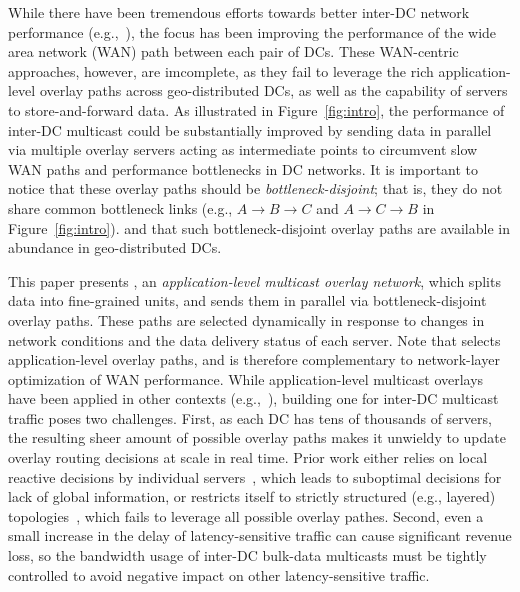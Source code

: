 While there have been tremendous efforts towards better inter-DC 
network performance (e.g.,~\cite{savage1999Theend,jain2013b4,
kumar2015bwe,hong2013achieving,zhang2015guarantee}), the focus has
been improving the performance of the wide area network (WAN) path 
between each pair of DCs. These WAN-centric approaches, however, are
imcomplete, as they fail to leverage the rich application-level 
overlay paths across geo-distributed DCs, as well as the capability 
of servers to store-and-forward data.
As illustrated in Figure~\ref{fig:intro}, the performance of inter-DC
multicast could be substantially improved by sending data in parallel
via multiple overlay servers acting as intermediate points to 
circumvent slow WAN paths and performance bottlenecks in DC networks.
It is important to notice that these overlay paths should be {\em 
bottleneck-disjoint}; that is, they do not share common bottleneck 
links (e.g., $A$$\rightarrow$$B$$\rightarrow$$C$ and  
$A$$\rightarrow$$C$$\rightarrow$$B$ in Figure~\ref{fig:intro}).
and that such bottleneck-disjoint overlay paths are available in 
abundance in geo-distributed DCs.




This paper presents {\em \name}, an {\em application-level multicast
overlay network}, which splits data into fine-grained units, and 
sends them in parallel via bottleneck-disjoint overlay paths. These 
paths are selected dynamically in response to changes in network 
conditions and the data delivery status of each server. Note that 
\name selects application-level overlay paths, and is therefore 
complementary to network-layer optimization of WAN performance. 
While application-level multicast overlays have been applied in other
contexts (e.g.,~\cite{Liebeherr2002Application,Wang2007mTreebone,
Andreev2013Designing,Mokhtarian2015Minimum}), building one for 
inter-DC multicast traffic poses two challenges. First, as each DC 
has tens of thousands of servers, the resulting sheer amount of 
possible overlay paths makes it unwieldy to update overlay routing 
decisions at scale in real time. Prior work either relies on local 
reactive decisions by individual servers~\cite{kostic2003bullet,
Repantis2010Scaling,Huang2014A}, which leads to suboptimal decisions 
for lack of global information, or restricts itself to strictly 
structured (e.g., layered) topologies~\cite{Nygren2010The}, which 
fails to leverage all possible overlay pathes. Second, even a small 
increase in the delay of latency-sensitive traffic can cause 
significant revenue loss, so the bandwidth usage of inter-DC 
bulk-data multicasts must be tightly controlled to avoid negative 
impact on other latency-sensitive traffic.

